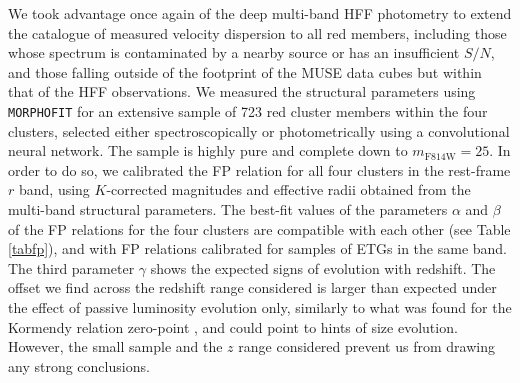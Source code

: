 \documentclass{aa}
\begin{document}
We took advantage once again of the deep multi-band HFF photometry to extend the catalogue of measured velocity dispersion to all red members, including those whose spectrum is contaminated by a nearby source or has an insufficient $S/N$, and those falling outside of the footprint of the MUSE data cubes but within that of the HFF observations. We measured the structural parameters using \texttt{MORPHOFIT} for an extensive sample of 723 red cluster members within the four clusters, selected either spectroscopically or photometrically using a convolutional neural network. The sample is highly pure and complete down to $m_\mathrm{F814W}=25$. In order to do so, we calibrated the FP relation for all four clusters in the rest-frame $r$ band, using $K$-corrected magnitudes and effective radii obtained from the multi-band structural parameters. The best-fit values of the parameters $\alpha$ and $\beta$ of the FP relations for the four clusters are compatible with each other (see Table \ref{tabfp}), and with FP relations calibrated for samples of ETGs in the same band. The third parameter $\gamma$ shows the expected signs of evolution with redshift. The offset we find across the redshift range considered is larger than expected under the effect of passive luminosity evolution only, similarly to what was found for the Kormendy relation zero-point \citep{tortorelli18}, and could point to hints of size evolution. However, the small sample and the $z$ range considered prevent us from drawing any strong conclusions. 
\end{document}
